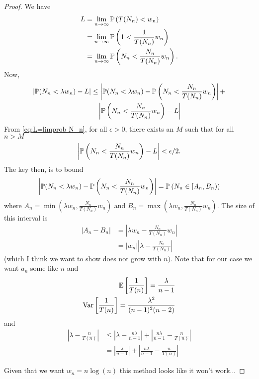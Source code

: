 	\begin{proof}
		We have
	 	\begin{align}
			L &= \lim_{n \rightarrow \infty} \mathbb{P}\left(T(N_n) < w_n\right)\\
			&= \lim_{n \rightarrow \infty} \mathbb{P}\left(1 < \frac{1}{T(N_n)} w_n\right)\\
			&= \lim_{n \rightarrow \infty} \mathbb{P}\left(N_n < \frac{N_n}{T(N_n)} w_n\right) \label{eq:L=limprob N_n}.
		\end{align}	
		Now,
		\begin{align}
			|\mathbb{P}(N_n < \lambda w_n) - L| &\leq \left|\mathbb{P}(N_n < \lambda w_n) - \mathbb{P}\left(N_n < \frac{N_n}{T(N_n)} w_n\right)\right| + \\
				&\phantom{\leq \,} \left|\mathbb{P}\left(N_n < \frac{N_n}{T(N_n)} w_n\right) - L\right| \notag
		\end{align}
		From \eqref{eq:L=limprob N_n}, for all $\epsilon > 0$, there exists an $M$ such that for all $n > M$
		\begin{equation}
			\left|\mathbb{P}\left(N_n < \frac{N_n}{T(N_n)} w_n\right) - L\right| < \epsilon / 2.
		\end{equation}
		The key then, is to bound
		\begin{equation}
			\left|\mathbb{P}(N_n < \lambda w_n) - \mathbb{P}\left(N_n < \frac{N_n}{T(N_n)} w_n\right)\right| = \mathbb{P}\left(N_n \in [A_n, B_n)\right)
		\end{equation}
		where $A_n = \min\left(\lambda w_n, \frac{N_n}{T(N_n)} w_n \right)$ and $B_n = \max\left(\lambda w_n, \frac{N_n}{T(N_n)} w_n \right)$. The size of this interval is
		\begin{align}
			|A_n - B_n| &= \left|\lambda w_n - \frac{N_n}{T(N_n)}w_n\right|\\
			&= |w_n| \left|\lambda - \frac{N_n}{T(N_n)}\right|
		\end{align}
		(which I think we want to show does not grow with $n$).
		Note that for our case we want $a_n$ some like $n$ and 
		\begin{align}
			\mathbb{E}\left[\frac{1}{T(n)}\right] = \frac{\lambda}{n-1}\\
			\mathrm{Var}\left[\frac{1}{T(n)}\right] = \frac{\lambda^2}{(n-1)^2(n-2)}\\
		\end{align}
		and
		\begin{align}
			\left|\lambda - \frac{n}{T(n)}\right| &\leq \left|\lambda - \frac{n \lambda}{n-1}\right| + \left|\frac{n \lambda}{n-1} - \frac{n}{T(n)}\right|\\
			&= \left|\frac{\lambda}{n-1}\right| + \left|\frac{n \lambda}{n-1} - \frac{n}{T(n)}\right|
		\end{align}

		Given that we want $w_n = n\log(n)$ this method looks like it won't work...

	\end{proof}

